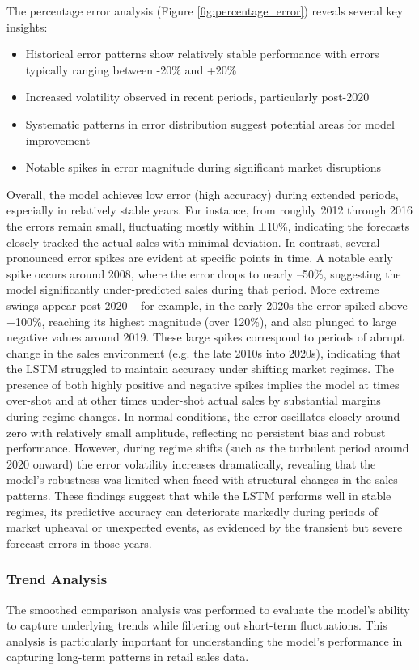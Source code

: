 \documentclass[12pt,a4paper]{report}
\begin{document}
The percentage error analysis (Figure \ref{fig:percentage_error}) reveals several key insights:
\begin{itemize}
    \item Historical error patterns show relatively stable performance with errors typically ranging between -20\% and +20\%
    \item Increased volatility observed in recent periods, particularly post-2020
    \item Systematic patterns in error distribution suggest potential areas for model improvement
    \item Notable spikes in error magnitude during significant market disruptions
\end{itemize}
Overall, the model achieves low error (high accuracy) during extended periods, especially in relatively stable years. For instance, from roughly 2012 through 2016 the errors remain small, fluctuating mostly within ±10\%, indicating the forecasts closely tracked the actual sales with minimal deviation. In contrast, several pronounced error spikes are evident at specific points in time. A notable early spike occurs around 2008, where the error drops to nearly –50\%, suggesting the model significantly under-predicted sales during that period. More extreme swings appear post-2020 – for example, in the early 2020s the error spiked above +100\%, reaching its highest magnitude (over 120\%), and also plunged to large negative values around 2019. These large spikes correspond to periods of abrupt change in the sales environment (e.g. the late 2010s into 2020s), indicating that the LSTM struggled to maintain accuracy under shifting market regimes. The presence of both highly positive and negative spikes implies the model at times over-shot and at other times under-shot actual sales by substantial margins during regime changes. In normal conditions, the error oscillates closely around zero with relatively small amplitude, reflecting no persistent bias and robust performance. However, during regime shifts (such as the turbulent period around 2020 onward) the error volatility increases dramatically, revealing that the model's robustness was limited when faced with structural changes in the sales patterns. These findings suggest that while the LSTM performs well in stable regimes, its predictive accuracy can deteriorate markedly during periods of market upheaval or unexpected events, as evidenced by the transient but severe forecast errors in those years.
\subsubsection{Trend Analysis}
The smoothed comparison analysis was performed to evaluate the model's ability to capture underlying trends while filtering out short-term fluctuations. This analysis is particularly important for understanding the model's performance in capturing long-term patterns in retail sales data.
\end{document}
